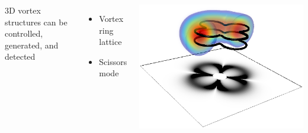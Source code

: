 \documentclass{beamer}
\begin{document}
\begin{frame}
\pause
\begin{columns}
3D vortex structures can be controlled, generated, and detected
\begin{itemize}
\item Vortex ring lattice
\item Scissors mode
\end{itemize}
\includegraphics[width=\textwidth]{../data/3d/HE21_3d}
\end{columns}

\end{frame}
\end{document}
